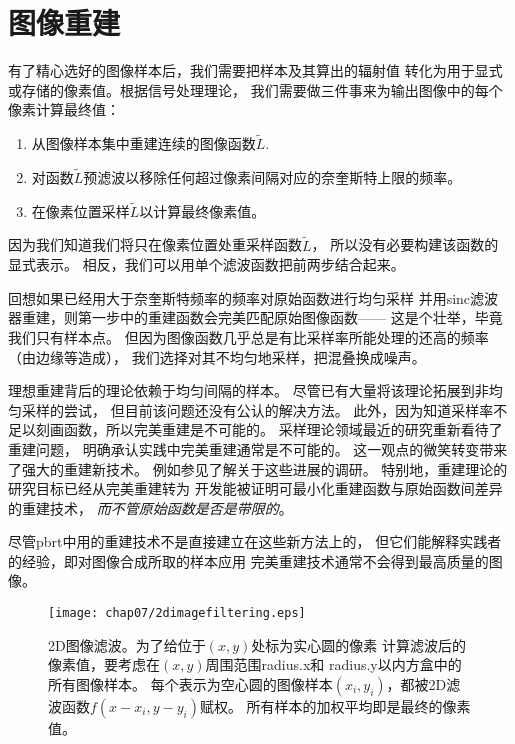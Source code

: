 \section{图像重建}\label{sec:图像重建}
有了精心选好的图像样本后，我们需要把样本及其算出的辐射值
转化为用于显式或存储的像素值。根据信号处理理论，
我们需要做三件事来为输出图像中的每个像素计算最终值：
\begin{enumerate}
    \item 从图像样本集中重建连续的图像函数$\tilde{L}$.
    \item 对函数$\tilde{L}$预滤波以移除任何超过像素间隔对应的奈奎斯特上限的频率。
    \item 在像素位置采样$\tilde{L}$以计算最终像素值。
\end{enumerate}

因为我们知道我们将只在像素位置处重采样函数$\tilde{L}$，
所以没有必要构建该函数的显式表示。
相反，我们可以用单个滤波函数把前两步结合起来。

回想如果已经用大于奈奎斯特频率的频率对原始函数进行均匀采样
并用sinc滤波器重建，则第一步中的重建函数会完美匹配原始图像函数——
这是个壮举，毕竟我们只有样本点。
但因为图像函数几乎总是有比采样率所能处理的还高的频率（由边缘等造成），
我们选择对其不均匀地采样，把混叠换成噪声。

理想重建背后的理论依赖于均匀间隔的样本。
尽管已有大量将该理论拓展到非均匀采样的尝试，
但目前该问题还没有公认的解决方法。
此外，因为知道采样率不足以刻画函数，所以完美重建是不可能的。
采样理论领域最近的研究重新看待了重建问题，
明确承认实践中完美重建通常是不可能的。
这一观点的微笑转变带来了强大的重建新技术。
例如参见\citet{843002}了解关于这些进展的调研。
特别地，重建理论的研究目标已经从完美重建转为
开发能被证明可最小化重建函数与原始函数间差异的重建技术，
\emph{而不管原始函数是否是带限的}。

尽管pbrt中用的重建技术不是直接建立在这些新方法上的，
但它们能解释实践者的经验，即对图像合成所取的样本应用
完美重建技术通常不会得到最高质量的图像。
\begin{figure}[htbp]
    \centering\texttt{[image: chap07/2dimagefiltering.eps]}
    \caption{2D图像滤波。为了给位于$(x,y)$处标为实心圆的像素
    计算滤波后的像素值，要考虑在$(x,y)$周围范围{\ttfamily radius.x}和
    {\ttfamily radius.y}以内方盒中的所有图像样本。
    每个表示为空心圆的图像样本$(x_i,y_i)$，都被2D滤波函数$f(x-x_i,y-y_i)$赋权。
    所有样本的加权平均即是最终的像素值。}
    \label{fig:7.38}
\end{figure}


